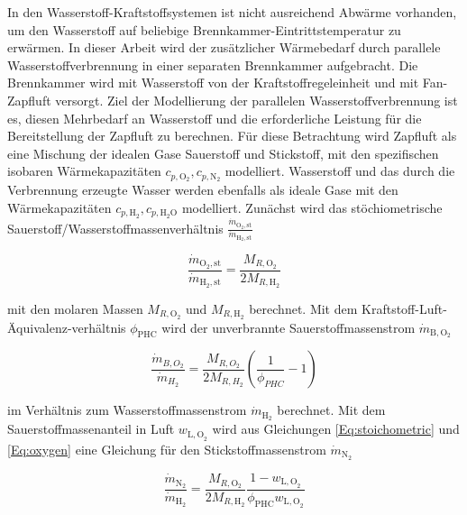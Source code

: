 In den Wasserstoff-Kraftstoffsystemen ist nicht ausreichend Abwärme vorhanden, um den Wasserstoff auf beliebige Brennkammer-Eintrittstemperatur zu erwärmen. In dieser Arbeit wird der zusätzlicher Wärmebedarf durch parallele Wasserstoffverbrennung in einer separaten Brennkammer aufgebracht. Die Brennkammer wird mit Wasserstoff von der Kraftstoffregeleinheit und mit Fan-Zapfluft versorgt. Ziel der Modellierung der parallelen Wasserstoffverbrennung ist es, diesen Mehrbedarf an Wasserstoff und die erforderliche Leistung für die Bereitstellung der Zapfluft zu berechnen. Für diese Betrachtung wird Zapfluft als eine Mischung der idealen Gase Sauerstoff und Stickstoff, mit den spezifischen isobaren Wärmekapazitäten $c_{p,\mathrm{O}_2}, c_{p,\mathrm{N}_2}$ modelliert. Wasserstoff und das durch die Verbrennung erzeugte Wasser werden ebenfalls als ideale Gase mit den Wärmekapazitäten $c_{p,\mathrm{H}_2}, c_{p,\mathrm{H}_2\mathrm{O}}$ modelliert. Zunächst wird das stöchiometrische Sauerstoff/Wasserstoffmassenverhältnis $\frac{\dot{m}_{\mathrm{O}_2, \mathrm{st}}}{\dot{m}_{\mathrm{H}_2,\mathrm{st}}}$ 

\begin{equation}\label{Eq:stoichometric}
	\frac{\dot{m}_{\mathrm{O}_2,\mathrm{st}}}{\dot{m}_{\mathrm{H}_2,\mathrm{st}}}=\frac{M_{R,\mathrm{O}_2}}{2M_{R,\mathrm{H}_2}}
\end{equation}

mit den molaren Massen $M_{R,\mathrm{O}_2}$ und $M_{R,\mathrm{H}_2}$ berechnet. Mit dem Kraftstoff-Luft-Äquivalenz-verhältnis $\phi_{\mathrm{PHC}}$ wird der unverbrannte Sauerstoffmassenstrom $\dot{m}_{\mathrm{B},\mathrm{O}_2}$ 

\begin{equation}\label{Eq:oxygen}
	\frac{\dot{m}_{B,O_2}}{\dot{m}_{H_2}}=\frac{M_{R,O_2}}{2M_{R,H_2}}\left(\frac{1}{\phi_{PHC}}-1\right)
\end{equation}

im Verhältnis zum Wasserstoffmassenstrom $\dot{m}_{\mathrm{H}_2}$ berechnet. Mit dem Sauerstoffmassenanteil in Luft $w_{\mathrm{L, O}_2}$ wird aus Gleichungen \ref{Eq:stoichometric} und \ref{Eq:oxygen} eine Gleichung für den Stickstoffmassenstrom $\dot{m}_{\mathrm{N}_2}$ 

\begin{equation}\label{Eq:nitrogen}
	\frac{\dot{m}_{\mathrm{N}_2}}{\dot{m}_{\mathrm{H}_2}}=\frac{M_{R,\mathrm{O}_2}}{2M_{R,\mathrm{H}_2}}\frac{1-w_{\mathrm{L,O}_2}}{\phi_{\mathrm{PHC}}w_{\mathrm{L,O}_2}}
\end{equation}

